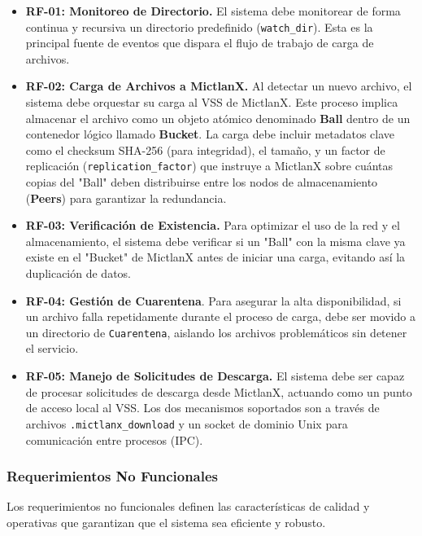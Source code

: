 \begin{itemize}
    \item \textbf{RF-01: Monitoreo de Directorio.} El sistema debe monitorear de forma continua y recursiva un directorio predefinido (\texttt{watch\_dir}). Esta es la principal fuente de eventos que dispara el flujo de trabajo de carga de archivos.
    
    \item \textbf{RF-02: Carga de Archivos a MictlanX.} Al detectar un nuevo archivo, el sistema debe orquestar su carga al VSS de MictlanX. Este proceso implica almacenar el archivo como un objeto atómico denominado \textbf{Ball} dentro de un contenedor lógico llamado \textbf{Bucket}. La carga debe incluir metadatos clave como el checksum SHA-256 (para integridad), el tamaño, y un factor de replicación (\texttt{replication\_factor}) que instruye a MictlanX sobre cuántas copias del "Ball" deben distribuirse entre los nodos de almacenamiento (\textbf{Peers}) para garantizar la redundancia.
    
    \item \textbf{RF-03: Verificación de Existencia.} Para optimizar el uso de la red y el almacenamiento, el sistema debe verificar si un "Ball" con la misma clave ya existe en el "Bucket" de MictlanX antes de iniciar una carga, evitando así la duplicación de datos.
    
    \item \textbf{RF-04: Gestión de Cuarentena}. Para asegurar la alta disponibilidad, si un archivo falla repetidamente durante el proceso de carga, debe ser movido a un directorio de \texttt{Cuarentena}, aislando los archivos problemáticos sin detener el servicio.
    
    \item \textbf{RF-05: Manejo de Solicitudes de Descarga.} El sistema debe ser capaz de procesar solicitudes de descarga desde MictlanX, actuando como un punto de acceso local al VSS. Los dos mecanismos soportados son a través de archivos \texttt{.mictlanx\_download} y un socket de dominio Unix para comunicación entre procesos (IPC).
\end{itemize}

\subsubsection{Requerimientos No Funcionales}
Los requerimientos no funcionales definen las características de calidad y operativas que garantizan que el sistema sea eficiente y robusto.

